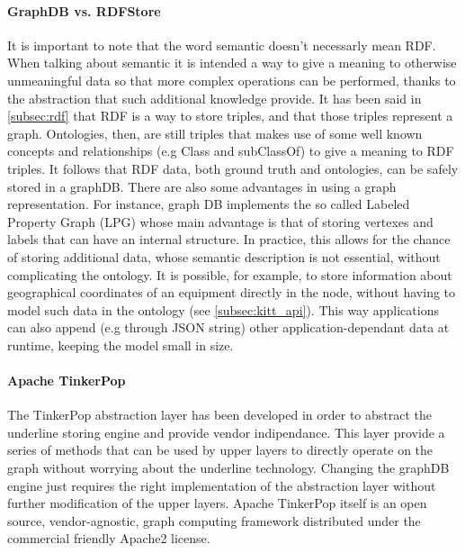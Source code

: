 \paragraph{GraphDB vs. RDFStore}
It is important to note that the word semantic doesn't necessarly mean RDF. When talking about semantic it is intended a way to give a meaning to otherwise unmeaningful data so that more complex operations can be performed, thanks to the abstraction that such additional knowledge provide. It has been said in \autoref{subsec:rdf} that RDF is a way to store triples, and that those triples represent a graph. Ontologies, then, are still triples that makes use of some well known concepts and relationships (e.g Class and subClassOf) to give a meaning to RDF triples. It follows that RDF data, both ground truth and ontologies, can be safely stored in a graphDB. There are also some advantages in using a graph representation. For instance, graph DB implements the so called Labeled Property Graph (LPG) whose main advantage is that of storing vertexes and labels that can have an internal structure. In practice, this allows for the chance of storing additional data, whose semantic description is not essential, without complicating the ontology. It is possible, for example, to store information about geographical coordinates of an equipment directly in the node, without having to model such data in the ontology (see \autoref{subsec:kitt_api}). This way applications can also append (e.g through JSON string) other application-dependant data at runtime, keeping the model small in size.
\paragraph{Apache TinkerPop}
The TinkerPop abstraction layer has been developed in order to abstract the underline storing engine and provide vendor indipendance. This layer provide a series of methods that can be used by upper layers to directly operate on the graph without worrying about the underline technology. Changing the graphDB engine just requires the right implementation of the abstraction layer without further modification of the upper layers. Apache TinkerPop itself is an open source, vendor-agnostic, graph computing framework distributed under the commercial friendly Apache2 license.

